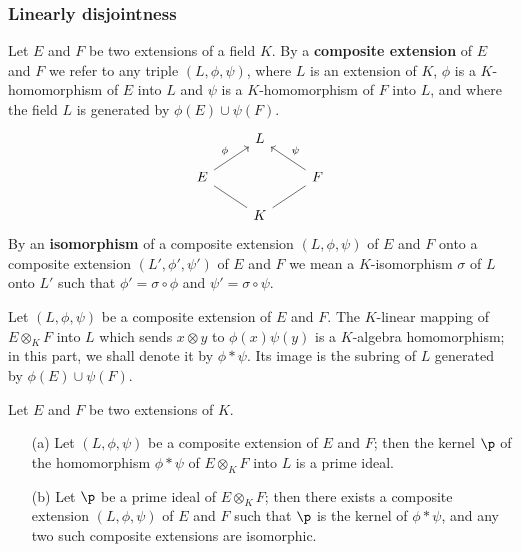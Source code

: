 \subsubsection{Linearly disjointness}
Let $E$ and $F$ be two extensions of a field $K$. By a \textbf{composite extension} of $E$ and $F$ we refer to any triple $(L,\phi,\psi)$, where $L$ is an extension of $K$, $\phi$ is a $K$-homomorphism of $E$ into $L$ and $\psi$ is a $K$-homomorphism of $F$ into $L$, and where the field $L$ is generated by $\phi(E)\cup\psi(F)$.
\[\begin{tikzcd}[row sep=scriptsize]
&L&\\
E\ar[ru,"\phi"]&&F\ar[lu,swap,"\psi"]\\
&K\ar[ru,no head]\ar[lu,no head]&
\end{tikzcd}\]
By an \textbf{isomorphism} of a composite extension $(L,\phi,\psi)$ of $E$ and $F$ onto a composite extension $(L',\phi',\psi')$ of $E$ and $F$ we mean a $K$-isomorphism $\sigma$ of $L$ onto $L'$ such that $\phi'=\sigma\circ\phi$ and $\psi'=\sigma\circ\psi$.\par
Let $(L,\phi,\psi)$ be a composite extension of $E$ and $F$. The $K$-linear mapping of $E\otimes_KF$ into $L$ which sends $x\otimes y$ to $\phi(x)\psi(y)$ is a $K$-algebra homomorphism; in this part, we shall denote it by $\phi\ast\psi$. Its image is the subring of $L$ generated by $\phi(E)\cup\psi(F)$.
\begin{proposition}\label{composite extension char}
Let $E$ and $F$ be two extensions of $K$.
\begin{itemize}
\item[(a)] Let $(L,\phi,\psi)$ be a composite extension of $E$ and $F$; then the kernel $\p$ of the homomorphism $\phi\ast\psi$ of $E\otimes_KF$ into $L$ is a prime ideal.
\item[(b)] Let $\p$ be a prime ideal of $E\otimes_KF$; then there exists a composite extension $(L,\phi,\psi)$ of $E$ and $F$ such that $\p$ is the kernel of $\phi\ast\psi$, and any two such composite extensions are isomorphic.
\end{itemize}
\end{proposition}
